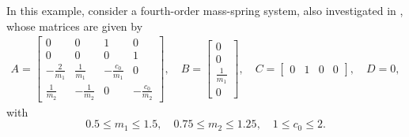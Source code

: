 \documentclass[english,11pt]{article}
\theoremstyle{break} \theorembodyfont{\small\rm}
\begin{document}
In this example, consider a fourth-order mass-spring system, also investigated  
in \cite{OP:08b}, whose matrices are given by
\begin{align*}
 A = \begin{bmatrix}
      0 & 0 & 1 & 0 \\
      0 & 0 & 0 & 1 \\
      -\frac{2}{m_1} & \frac{1}{m_1} & -\frac{c_0}{m_1} & 0 \\
      \frac{1}{m_2} & -\frac{1}{m_2} & 0 & -\frac{c_0}{m_2}
     \end{bmatrix}, \quad
 B = \begin{bmatrix} 0 \\ 0 \\ \frac{1}{m_1} \\ 0 \end{bmatrix}, \quad
 C = \begin{bmatrix} 0 & 1 & 0 & 0 \end{bmatrix}, \quad D = 0,
\end{align*}
with
\[
 0.5 \leq m_1 \leq 1.5, \quad 0.75 \leq m_2 \leq 1.25, \quad 1 \leq c_0 \leq 2.
\]
\end{document}
